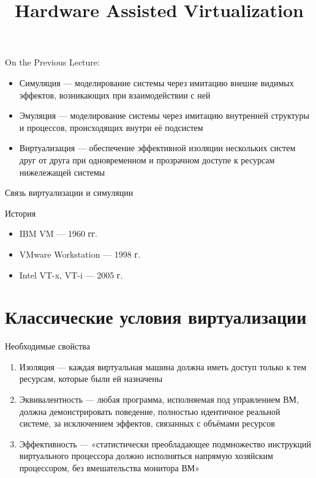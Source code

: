 
\title{Hardware Assisted Virtualization}



\startslides

\begin{frame}{On the Previous Lecture:}
\begin{itemize}
\item Симуляция —  моделирование системы через имитацию внешне видимых эффектов, возникающих при взаимодействии с ней
\item Эмуляция — моделирование системы через имитацию внутренней структуры и процессов, происходящих внутри её подсистем
\item Виртуализация — обеспечение эффективной изоляции нескольких систем друг от друга при одновременном и прозрачном доступе к ресурсам нижележащей системы
\end{itemize}

\end{frame}

\begin{frame}{Связь виртуализации и симуляции}

\centering
{}

\vfill


\end{frame}

\begin{frame}{История}
\begin{itemize}
\item IBM VM — 1960 гг. \cite{goldberg}
\item VMware Workstation — 1998 г.
\item Intel VT-x, VT-i — 2005 г.
\end{itemize}


\end{frame}

\section{Классические условия виртуализации}

\begin{frame}{Необходимые свойства}

\begin{enumerate}
\item Изоляция — каждая виртуальная машина должна иметь доступ только к тем ресурсам, которые были ей назначены
\item Эквивалентность — любая программа, исполняемая под управлением ВМ, должна демонстрировать поведение, полностью идентичное реальной системе, за исключением эффектов, связанных с объёмами ресурсов
\item Эффективность — «статистически преобладающее подмножество инструкций виртуального процессора должно исполняться напрямую хозяйским процессором, без вмешательства монитора ВМ»
\end{enumerate}

\end{frame}

